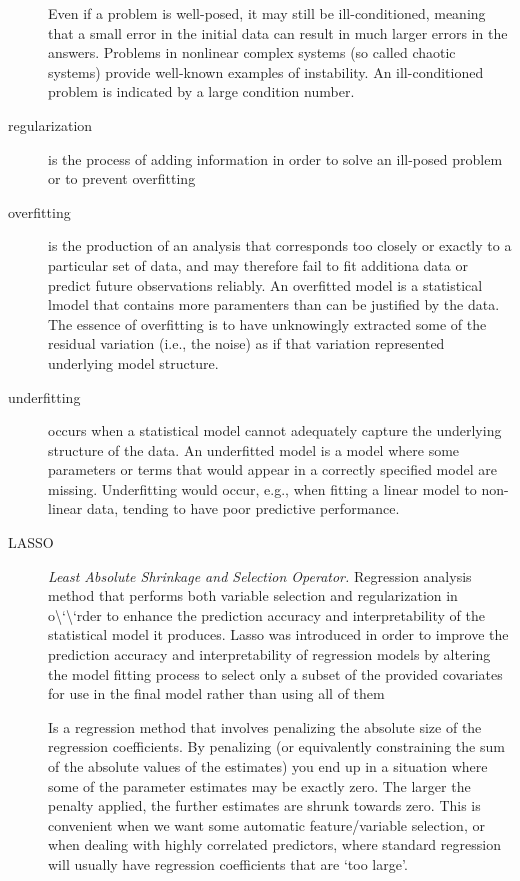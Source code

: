 \documentclass[
]{book}
\begin{document}
\begin{description}
Even if a problem is well-posed, it may still be ill-conditioned, meaning that a small error in the initial data can result in much larger errors in the answers. Problems in nonlinear complex systems (so called chaotic systems) provide well-known examples of instability. An ill-conditioned problem is indicated by a large condition number.
\item[regularization]
is the process of adding information in order to solve an ill-posed problem or to prevent overfitting
\item[overfitting]
is the production of an analysis that corresponds too closely or exactly to a particular set of data, and may therefore fail to fit additiona data or predict future observations reliably. An overfitted model is a statistical lmodel that contains more paramenters than can be justified by the data. The essence of overfitting is to have unknowingly extracted some of the residual variation (i.e., the noise) as if that variation represented underlying model structure.
\item[underfitting]
occurs when a statistical model cannot adequately capture the underlying structure of the data. An underfitted model is a model where some parameters or terms that would appear in a correctly specified model are missing. Underfitting would occur, e.g., when fitting a linear model to non-linear data, tending to have poor predictive performance.
\item[LASSO]
\emph{Least Absolute Shrinkage and Selection Operator.} Regression analysis method that performs both variable selection and regularization in o\textbackslash`\textbackslash`rder to enhance the prediction accuracy and interpretability of the statistical model it produces. Lasso was introduced in order to improve the prediction accuracy and interpretability of regression models by altering the model fitting process to select only a subset of the provided covariates for use in the final model rather than using all of them

Is a regression method that involves penalizing the absolute size of the regression coefficients. By penalizing (or equivalently constraining the sum of the absolute values of the estimates) you end up in a situation where some of the parameter estimates may be exactly zero. The larger the penalty applied, the further estimates are shrunk towards zero. This is convenient when we want some automatic feature/variable selection, or when dealing with highly correlated predictors, where standard regression will usually have regression coefficients that are `too large'.


\end{description}
\end{document}
